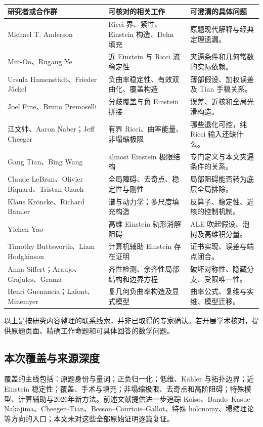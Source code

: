 \documentclass[11pt,a4paper]{article}
\theoremstyle{definition}
\begin{document}
\begin{longtable}{P{0.30\textwidth}P{0.34\textwidth}P{0.27\textwidth}}
\toprule
研究者或合作群 & 可核对的相关工作 & 可澄清的具体问题\\\midrule\endhead
Michael T. Anderson & Ricci 界、紧性、Einstein 构造、Dehn 填充 & 原题现代解释与经典定理遗漏。\\
Min-Oo、Rugang Ye & 近 Einstein 与 Ricci 流稳定性 & 夹逼条件和几何常数的实际依赖。\\
Ursula Hamenstädt、Frieder Jäckel & 负曲率稳定性、有效双曲化、覆盖构造 & 薄部假设、加权误差及 Tian 手稿关系。\\
Joel Fine、Bruno Premoselli & 分歧覆盖与负 Einstein 拼接 & 误差、近核和全局光滑构造。\\
江文帅、Aaron Naber；Jeff Cheeger & 有界 Ricci、曲率能量、非塌缩极限 & 哪些退化可控，纯 Ricci 输入还缺什么。\\
Gang Tian、Bing Wang & almost Einstein 极限结构 & 专门定义与本文夹逼条件的关系。\\
Claude LeBrun、Olivier Biquard、Tristan Ozuch & 全局障碍、去奇点、稳定性与刚性 & 局部阻碍能否转为底层全局排除。\\
Klaus Kröncke、Richard Bamler & 谱与动力学；多尺度填充构造 & 反算子、稳定性、近核的控制机制。\\
Yichen Yao & 高维 Einstein 轨形消解阻碍 & ALE 吹起假设、泡树及高维积分量。\\
Timothy Buttsworth、Liam Hodgkinson & 计算机辅助 Einstein 存在证明 & 证书实现、误差与端点闭合。\\
Anna Siffert；Araujo、Grajales、Grama & 齐性检测、余齐性局部结构和边界方程 & 破坏对称性、隐藏分支、受限唯一性。\\
Henri Guenancia；Lafont、Minemyer & 复几何负曲率构造及显式模型 & 曲率公式、复维与实维、模型迁移。\\\bottomrule
\end{longtable}

以上是按研究内容整理的联系线索，并非已取得的专家确认。若开展学术核对，提供原题页面、精确工作命题和可具体回答的数学问题。

\subsection{本次覆盖与来源深度}

覆盖的主线包括：原题身份与量词；正负归一化；低维、Kähler 与拓扑边界；近 Einstein 稳定性；覆盖、手术与填充；非塌缩极限、去奇点和高阶阻碍；特殊模型、计算辅助与2026年新方法。前述文献提供进一步追踪 Koiso、Bando--Kasue--Nakajima、Cheeger--Tian、Besson--Courtois--Gallot、特殊 holonomy、塌缩理论等方向的入口；本文未对这些全部原始证明逐篇复证。
\end{document}
